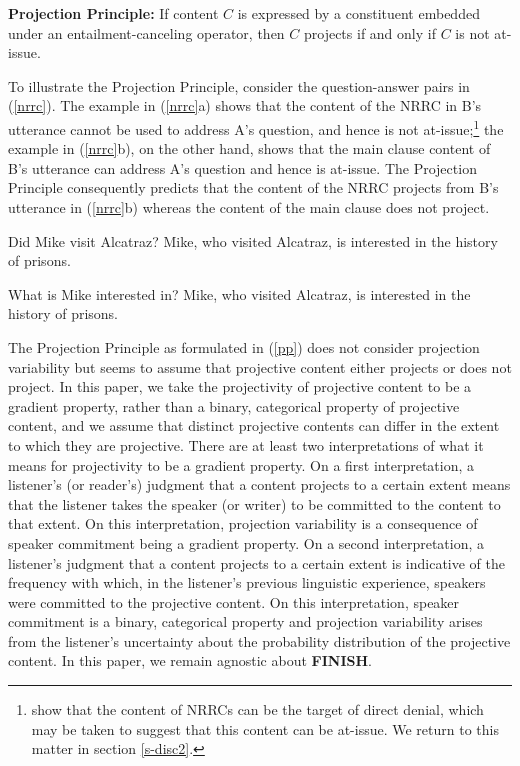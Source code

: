 \documentclass[11pt,fleqn]{article}
\newcommand{\6}{\mbox{$[\hspace*{-.6mm}[$}}
\newcommand{\9}{\mbox{$]\hspace*{-.6mm}]$}}
\def\infelic{{\leavevmode\llap{\#}}}
\begin{document}
\begin{exe}
\ex\label{pp} {\bf Projection Principle:} If content $C$ is expressed by a constituent embedded under an entailment-canceling operator, then $C$ projects if and only if $C$ is not at-issue.

\end{exe} 
To illustrate the Projection Principle, consider the question-answer pairs in (\ref{nrrc}). The example in (\ref{nrrc}a) shows that the content of the NRRC in B's utterance cannot be used to address A's question, and hence is not at-issue;\footnote{\citet{syrett-koev2015} show that the content of NRRCs can be the target of direct denial, which may be taken to suggest that this content can be at-issue. We return to this matter in section \ref{s-disc2}.} the example in (\ref{nrrc}b), on the other hand, shows that the main clause content of B's utterance can address A's question and hence is at-issue. The Projection Principle consequently predicts that the content of the NRRC projects from B's utterance in (\ref{nrrc}b) whereas the content of the main clause does not project. 

\begin{exe}
\ex\label{nrrc}
\begin{xlist}
\ex
\begin{xlist}
 Did Mike visit Alcatraz?
 \infelic Mike, who visited Alcatraz, is interested in the history of prisons.
\end{xlist}

\ex
\begin{xlist}
 What is Mike interested in?
 Mike, who visited Alcatraz, is interested in the history of prisons.
\end{xlist}

\end{xlist}
\end{exe}
The Projection Principle as formulated in (\ref{pp}) does not consider projection variability but seems to assume that projective content either projects or does not project. In this paper, we take the projectivity of projective content to be a gradient property, rather than a binary, categorical property of projective content, and we assume that distinct projective contents can differ in the extent to which they are projective. There are at least two interpretations of what it means for projectivity to be a gradient property. On a first interpretation, a listener's (or reader's) judgment that a content projects to a certain extent means that the listener takes the speaker (or writer) to be committed to the content to that extent. On this interpretation, projection variability is a consequence of speaker commitment being a gradient property. On a second interpretation, a listener's judgment that a content projects to a certain extent is indicative of the frequency with which, in the listener's previous linguistic experience, speakers were committed to the projective content. On this interpretation, speaker commitment is a binary, categorical property and projection variability arises from the listener's uncertainty about the probability distribution of the projective content. In this paper, we remain agnostic about {\bf FINISH}.
\end{document}
